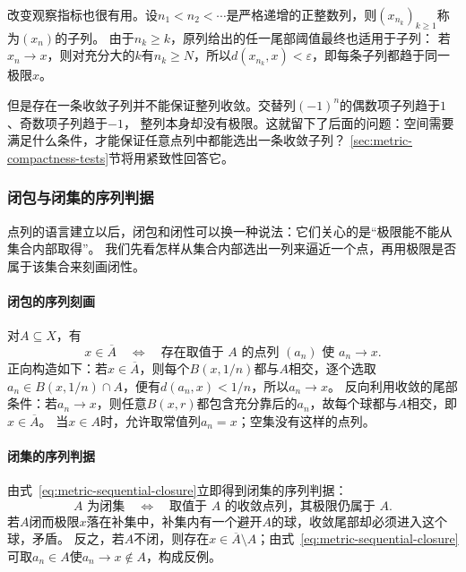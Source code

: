 改变观察指标也很有用。设$n_1<n_2<\cdots$是严格递增的正整数列，则$(x_{n_k})_{k\geq1}$称为$(x_n)$的子列。
由于$n_k\geq k$，原列给出的任一尾部阈值最终也适用于子列：
若$x_n\to x$，则对充分大的$k$有$n_k\geq N$，所以$d(x_{n_k},x)<\varepsilon$，即每条子列都趋于同一极限$x$。

但是存在一条收敛子列并不能保证整列收敛。交替列$(-1)^n$的偶数项子列趋于$1$、奇数项子列趋于$-1$，
整列本身却没有极限。这就留下了后面的问题：空间需要满足什么条件，才能保证任意点列中都能选出一条收敛子列？
\ref{sec:metric-compactness-tests}节将用紧致性回答它。

\subsubsection{闭包与闭集的序列判据}
\label{sec:metric-sequential-closedness}

点列的语言建立以后，闭包和闭性可以换一种说法：它们关心的是“极限能不能从集合内部取得”。
我们先看怎样从集合内部选出一列来逼近一个点，再用极限是否属于该集合来刻画闭性。

\paragraph{闭包的序列刻画}

对$A\subseteq X$，有
\begin{equation}
\label{eq:metric-sequential-closure}
  x\in\overline A
  \quad\Longleftrightarrow\quad
  \text{存在取值于 }A\text{ 的点列 }(a_n)\text{ 使 }a_n\to x.
\end{equation}
正向构造如下：若$x\in\overline A$，则每个$B(x,1/n)$都与$A$相交，逐个选取$a_n\in B(x,1/n)\cap A$，便有$d(a_n,x)<1/n$，所以$a_n\to x$。
反向利用收敛的尾部条件：若$a_n\to x$，则任意$B(x,r)$都包含充分靠后的$a_n$，故每个球都与$A$相交，即$x\in\overline A$。
当$x\in A$时，允许取常值列$a_n=x$；空集没有这样的点列。

\paragraph{闭集的序列判据}

由式~\eqref{eq:metric-sequential-closure}立即得到闭集的序列判据：
\begin{equation}
\label{eq:metric-sequential-closed}
  A\text{ 为闭集}
  \quad\Longleftrightarrow\quad
  \text{取值于 }A\text{ 的收敛点列，其极限仍属于 }A.
\end{equation}
若$A$闭而极限$x$落在补集中，补集内有一个避开$A$的球，收敛尾部却必须进入这个球，矛盾。
反之，若$A$不闭，则存在$x\in\overline A\setminus A$；由式~\eqref{eq:metric-sequential-closure}可取$a_n\in A$使$a_n\to x\notin A$，构成反例。

